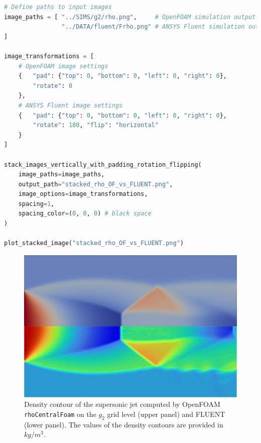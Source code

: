 \documentclass[12pt]{article}
\begin{document}
\begin{lstlisting}[language=Python, caption=Script to stack and plot numerical results of OpenFOAM and FLUENT., label=lst:stacking]
# Define paths to input images
image_paths = [ "../SIMS/g2/rho.png",     # OpenFOAM simulation output
                "../DATA/fluent/Frho.png" # ANSYS Fluent simulation output
]

image_transformations = [
    # OpenFOAM image settings
    {   "pad": {"top": 0, "bottom": 0, "left": 0, "right": 0}, 
        "rotate": 0 
    },
    # ANSYS Fluent image settings
    {   "pad": {"top": 0, "bottom": 0, "left": 0, "right": 0}, 
        "rotate": 180, "flip": "horizontal" 
    }
]

stack_images_vertically_with_padding_rotation_flipping(
    image_paths=image_paths,
    output_path="stacked_rho_OF_vs_FLUENT.png",
    image_options=image_transformations,
    spacing=1,
    spacing_color=(0, 0, 0) # black space
)

plot_stacked_image("stacked_rho_OF_vs_FLUENT.png")
\end{lstlisting}

\begin{figure}[H]
    \centering
    \includegraphics[width=0.925\linewidth]{figs/stacked_rho_OF_vs_FLUENT.png}
    \caption{Density contour of the supersonic jet computed by OpenFOAM \texttt{rhoCentralFoam} on the $g_2$ grid level (upper panel) and FLUENT (lower panel). The values of the density contours are provided in $kg/m^3$.}
    \label{fig:rho_OF_vs_FLUENT}
\end{figure}
\end{document}
